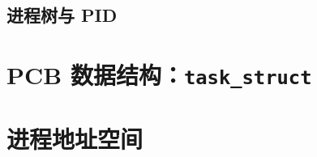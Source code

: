 \subsection{进程树与 PID}


\section{PCB 数据结构：\texttt{task\_struct}}
\label{sec:proc-pcb}


\section{进程地址空间}
\label{sec:proc-address-space}



